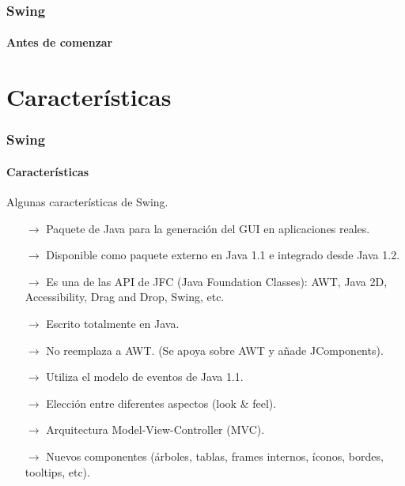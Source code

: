 \documentclass{beamer}
\begin{document}
    \begin{frame}
		\frametitle{Swing}
		\framesubtitle{Antes de comenzar}
		\begin{center}
		\end{center}
	\end{frame}

    \section{Caracter\'isticas}

	\begin{frame}
		\frametitle{Swing}
		\framesubtitle{Caracter\'isticas}

		Algunas caracter\'isticas de Swing.
		{\scriptsize
		\begin{itemize}
		    \item[$\rightarrow$] Paquete de Java para la generaci\'on del GUI en aplicaciones reales.
		    \item[$\rightarrow$] Disponible como paquete externo en Java 1.1 e integrado desde Java 1.2.
		    \item[$\rightarrow$] Es una de las API de JFC (Java Foundation Classes): AWT, Java 2D, Accessibility, Drag and Drop, Swing, etc.
		    \item[$\rightarrow$] Escrito totalmente en Java.
		    \item[$\rightarrow$] No reemplaza a AWT. (Se apoya sobre AWT y a\~nade JComponents).
		    \item[$\rightarrow$] Utiliza el modelo de eventos de Java 1.1.
		    \item[$\rightarrow$] Elecci\'on entre diferentes aspectos (look \& feel).
		    \item[$\rightarrow$] Arquitectura Model-View-Controller (MVC).
		    \item[$\rightarrow$] Nuevos componentes (\'arboles, tablas, frames internos, \'iconos, bordes, tooltips, etc).
		\end{itemize}}
	\end{frame}
\end{document}
